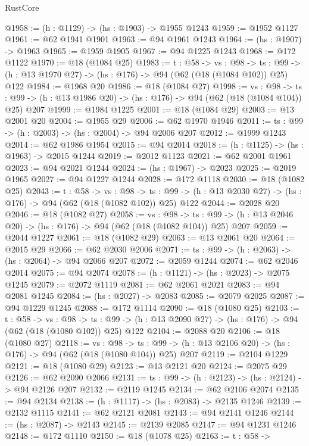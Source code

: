 \begin{lexlean}{RustCore}
\begin{coremodule}
@1958 := (h : @1129) -> (hs : @1903) -> @1955 @1243
@1959 := @1952 @1127
@1961 := @62 @1941 @1901
@1963 := @94 @1961 @1243
@1964 := (hs : @1907) -> @1963
@1965 := @1959 @1905
@1967 := @94 @1225 @1243
@1968 := @172 @1122
@1970 := @18 (@1084 @25)
@1983 := {t : @58} ->
  {vs : @98} ->
  {ts : @99} -> (h : @13 @1970 @27) -> (hs : @176) -> @94 (@62 (@18 (@1084 @102)) @25) @122
@1984 := @1968 @20
@1986 := @18 (@1084 @27)
@1998 := {vs : @98} ->
  {ts : @99} -> (h : @13 @1986 @20) -> (hs : @176) -> @94 (@62 (@18 (@1084 @104)) @25) @207
@1999 := @1984 @1225
@2001 := @18 (@1084 @29)
@2003 := @13 @2001 @20
@2004 := @1955 @29
@2006 := @62 @1970 @1946
@2011 := {ts : @99} -> (h : @2003) -> (hs : @2004) -> @94 @2006 @207
@2012 := @1999 @1243
@2014 := @62 @1986 @1954
@2015 := @94 @2014
@2018 := (h : @1125) -> (hs : @1963) -> @2015 @1244
@2019 := @2012 @1123
@2021 := @62 @2001 @1961
@2023 := @94 @2021 @1244
@2024 := (hs : @1967) -> @2023
@2025 := @2019 @1965
@2027 := @94 @1227 @1244
@2028 := @172 @1118
@2030 := @18 (@1082 @25)
@2043 := {t : @58} ->
  {vs : @98} ->
  {ts : @99} -> (h : @13 @2030 @27) -> (hs : @176) -> @94 (@62 (@18 (@1082 @102)) @25) @122
@2044 := @2028 @20
@2046 := @18 (@1082 @27)
@2058 := {vs : @98} ->
  {ts : @99} -> (h : @13 @2046 @20) -> (hs : @176) -> @94 (@62 (@18 (@1082 @104)) @25) @207
@2059 := @2044 @1227
@2061 := @18 (@1082 @29)
@2063 := @13 @2061 @20
@2064 := @2015 @29
@2066 := @62 @2030 @2006
@2071 := {ts : @99} -> (h : @2063) -> (hs : @2064) -> @94 @2066 @207
@2072 := @2059 @1244
@2074 := @62 @2046 @2014
@2075 := @94 @2074
@2078 := (h : @1121) -> (hs : @2023) -> @2075 @1245
@2079 := @2072 @1119
@2081 := @62 @2061 @2021
@2083 := @94 @2081 @1245
@2084 := (hs : @2027) -> @2083
@2085 := @2079 @2025
@2087 := @94 @1229 @1245
@2088 := @172 @1114
@2090 := @18 (@1080 @25)
@2103 := {t : @58} ->
  {vs : @98} ->
  {ts : @99} -> (h : @13 @2090 @27) -> (hs : @176) -> @94 (@62 (@18 (@1080 @102)) @25) @122
@2104 := @2088 @20
@2106 := @18 (@1080 @27)
@2118 := {vs : @98} ->
  {ts : @99} -> (h : @13 @2106 @20) -> (hs : @176) -> @94 (@62 (@18 (@1080 @104)) @25) @207
@2119 := @2104 @1229
@2121 := @18 (@1080 @29)
@2123 := @13 @2121 @20
@2124 := @2075 @29
@2126 := @62 @2090 @2066
@2131 := {ts : @99} -> (h : @2123) -> (hs : @2124) -> @94 @2126 @207
@2132 := @2119 @1245
@2134 := @62 @2106 @2074
@2135 := @94 @2134
@2138 := (h : @1117) -> (hs : @2083) -> @2135 @1246
@2139 := @2132 @1115
@2141 := @62 @2121 @2081
@2143 := @94 @2141 @1246
@2144 := (hs : @2087) -> @2143
@2145 := @2139 @2085
@2147 := @94 @1231 @1246
@2148 := @172 @1110
@2150 := @18 (@1078 @25)
@2163 := {t : @58} ->

\end{coremodule}
\end{lexlean}
